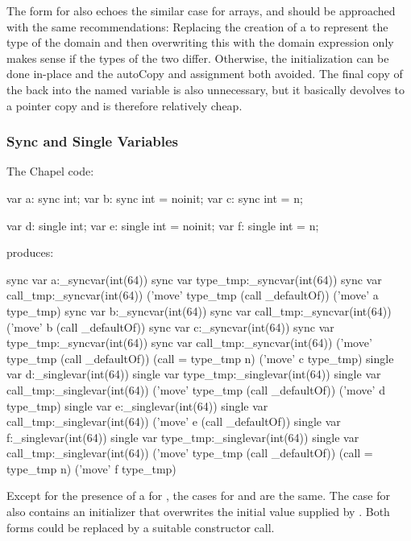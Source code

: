 The form for  also echoes the similar case for arrays, and should be approached
with the same recommendations: Replacing the creation of a  to represent
the type of the domain and then overwriting this with the domain expression only makes
sense if the types of the two differ.  Otherwise, the initialization can be done in-place
and the autoCopy and assignment both avoided.  The final copy of the  back
into the named variable is also unnecessary, but it basically devolves to a pointer copy
and is therefore relatively cheap.

\subsubsection{Sync and Single Variables}

The Chapel code:
\begin{chapel}
  var a: sync int;
  var b: sync int = noinit;
  var c: sync int = n;

  var d: single int;
  var e: single int = noinit;
  var f: single int = n;
\end{chapel}
\noindent
produces:
\begin{numberedchapel}
    sync var a:_syncvar(int(64))
    {
      sync var type_tmp:_syncvar(int(64))
      sync var call_tmp:_syncvar(int(64))
      ('move' type_tmp (call _defaultOf))
      ('move' a type_tmp)
    }
    sync var b:_syncvar(int(64))
    sync var call_tmp:_syncvar(int(64))
    ('move' b (call _defaultOf))
    sync var c:_syncvar(int(64))
    {
      sync var type_tmp:_syncvar(int(64))
      sync var call_tmp:_syncvar(int(64))
      ('move' type_tmp (call _defaultOf))
      (call = type_tmp n)
      ('move' c type_tmp)
    }
    single var d:_singlevar(int(64))
    {
      single var type_tmp:_singlevar(int(64))
      single var call_tmp:_singlevar(int(64))
      ('move' type_tmp (call _defaultOf))
      ('move' d type_tmp)
    }
    single var e:_singlevar(int(64))
    single var call_tmp:_singlevar(int(64))
    ('move' e (call _defaultOf))
    single var f:_singlevar(int(64))
    {
      single var type_tmp:_singlevar(int(64))
      single var call_tmp:_singlevar(int(64))
      ('move' type_tmp (call _defaultOf))
      (call = type_tmp n)
      ('move' f type_tmp)
    }
\end{numberedchapel}

Except for the presence of a  for , the cases for  and
 are the same.  The case for  also contains an initializer that
overwrites the initial value supplied by .  Both forms could be replaced
by a suitable constructor call.


